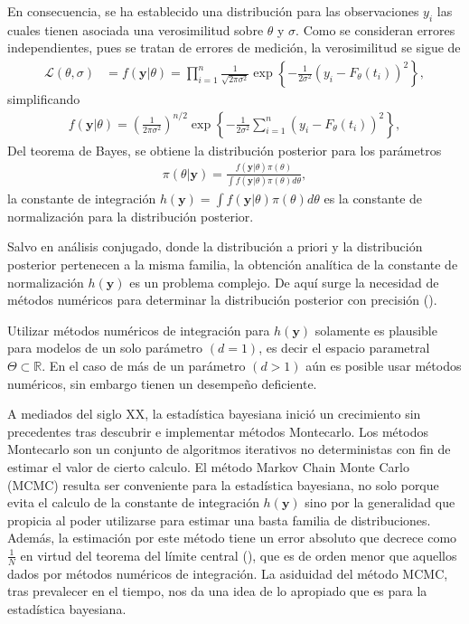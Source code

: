 En consecuencia, se ha establecido una distribución para las observaciones $y_i$ las cuales tienen asociada una verosimilitud sobre $\theta$ y $\sigma$. Como se consideran errores independientes, pues se tratan de errores de medición, la verosimilitud se sigue de
\begin{align*}
    \mathcal{L}(\theta,\sigma) &= f(\mathbf{y}|\theta) = \prod_{i = 1}^{n} \frac{1}{\sqrt{2\pi \sigma^2}} \exp \left \{ -\frac{1}{2\sigma^2}\left(y_i - F_{\theta}(t_i)\right)^2 \right \} , 
\end{align*}
simplificando
\begin{align}
    f(\mathbf{y}|\theta) = \left(\frac{1}{2\pi \sigma^2}\right) ^{n/2}\exp \left \{  -\frac{1}{2\sigma^2}\sum_{i = 1}^{n} \left(y_i - F_{\theta}(t_i)\right)^2 \right \},
    \label{2.2.03}
\end{align}
Del teorema de Bayes, se obtiene la distribución posterior para los parámetros
\begin{align}
    \pi(\theta| \mathbf{y})  = \frac{f(\mathbf{y}|\theta)\pi(\theta)}{\int f(\mathbf{y}|\theta)\pi(\theta)d \theta},
    \label{2.2.04}
\end{align}
la constante de integración $h(\mathbf{y}) = \int f(\mathbf{y}|\theta)\pi(\theta)d \theta$ es la constante de normalización para la distribución posterior. 

Salvo en análisis conjugado, donde la distribución a priori y la distribución posterior pertenecen a la misma familia, la obtención analítica de la constante de normalización $h(\mathbf{y})$ es un problema complejo. De aquí surge la necesidad de métodos numéricos para determinar la distribución posterior con precisión (\cite{robert1999monte}). 


Utilizar métodos numéricos de integración para $h(\mathbf{y})$ solamente es plausible para modelos de un solo parámetro $(d=1)$, es decir el espacio parametral $\Theta \subset \mathbb{R}$. En el caso de más de un parámetro $(d > 1)$ aún es posible usar métodos numéricos, sin embargo tienen un desempeño deficiente. 

A mediados del siglo XX, la estadística bayesiana inició un crecimiento sin precedentes tras descubrir e implementar métodos Montecarlo. Los métodos Montecarlo son un conjunto de algoritmos iterativos no deterministas con fin de estimar el valor de cierto calculo. El método Markov Chain Monte Carlo (MCMC) resulta ser conveniente para la estadística bayesiana, no solo porque evita el calculo de la constante de integración $h(\mathbf{y})$ sino por la generalidad que propicia al poder utilizarse para estimar una basta familia de distribuciones. Además, la estimación por este método tiene un error absoluto que decrece como $\frac{1}{N}$ en virtud del teorema del límite central (\cite{casella2024statistical}), que es de orden menor que aquellos dados por métodos numéricos de integración. La asiduidad del método MCMC, tras prevalecer en el tiempo, nos da una idea de lo apropiado que es para la estadística bayesiana.

